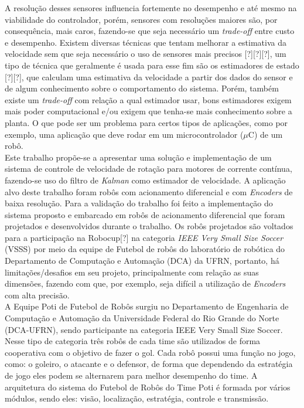 A resolução desses sensores influencia fortemente no desempenho e até mesmo na viabilidade do controlador, porém, sensores com resoluções maiores são, por consequência, mais caros, fazendo-se que seja necessário um \emph{trade-off} entre custo e desempenho. Existem diversas técnicas que tentam melhorar a estimativa da velocidade sem que seja necessário o uso de sensores mais precisos [?][?][?], um tipo de técnica que geralmente é usada para esse fim são os estimadores de estado [?][?], que calculam uma estimativa da velocidade a partir dos dados do sensor e de algum conhecimento sobre o comportamento do sistema. Porém, também existe um \emph{trade-off} com relação a qual estimador usar, bons estimadores exigem mais poder computacional e/ou exigem que tenha-se mais conhecimento sobre a planta. O que pode ser um problema para certos tipos de aplicações, como por exemplo, uma aplicação que deve rodar em um microcontrolador ($\mu$C) de um robô.\\


Este trabalho propõe-se a apresentar uma solução e implementação de um sistema de controle de velocidade de rotação para motores de corrente contínua, fazendo-se uso do filtro de \emph{Kalman} como estimador de velocidade. A aplicação alvo deste trabalho foram robôs com acionamento diferencial e com \emph{Encoders} de baixa resolução. Para a validação do trabalho foi feito a implementação do sistema proposto e embarcado em robôs de acionamento diferencial que foram projetados e desenvolvidos durante o trabalho. Os robôs projetados são voltados para a participação na Robocup[?] na categoria \emph{IEEE Very Small Size Soccer} (VSSS) por meio da equipe de Futebol de robôs do laboratório de robótica do Departamento de Computação e Automação (DCA) da UFRN, portanto, há limitações/desafios em seu projeto, principalmente com relação as suas dimensões, fazendo com que, por exemplo, seja difícil a utilização de \emph{Encoders} com alta precisão.\\



A Equipe Poti de Futebol de Robôs surgiu no Departamento de Engenharia de Computação e Automação da Universidade Federal do Rio Grande do Norte (DCA-UFRN), sendo participante na categoria IEEE Very Small Size Soccer.\\

Nesse tipo de categoria três robôs de cada time são utilizados de forma cooperativa com o objetivo de fazer o gol. Cada robô possui uma função no jogo, como: o goleiro, o atacante e o defensor, de forma que dependendo da estratégia de jogo eles podem se alternarem para melhor desempenho do time. A arquitetura do sistema do Futebol de Robôs do Time Poti é formada por vários módulos, sendo eles: visão, localização, estratégia, controle e transmissão.\\

